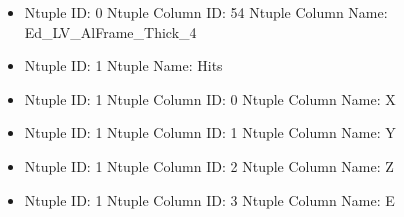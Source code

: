 \documentclass[8pt]{beamer}
\begin{document}
\begin{frame}
\begin{itemize}
        \item Ntuple ID: 0 Ntuple Column ID: 54 Ntuple Column Name: Ed\_LV\_AlFrame\_Thick\_4
        
        \item Ntuple ID: 1 Ntuple Name: Hits
        
        \item Ntuple ID: 1 Ntuple Column ID: 0 Ntuple Column Name: X
        
        \item Ntuple ID: 1 Ntuple Column ID: 1 Ntuple Column Name: Y
        
        \item Ntuple ID: 1 Ntuple Column ID: 2 Ntuple Column Name: Z
        
        \item Ntuple ID: 1 Ntuple Column ID: 3 Ntuple Column Name: E
        
        \end{itemize}
        
            \end{frame}
            
\end{document}
